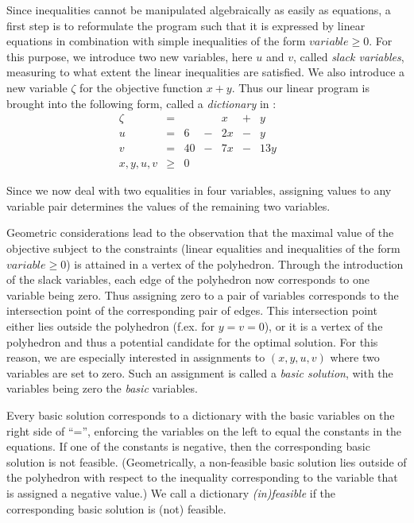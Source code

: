 \documentclass[ukenglish]{nik}
\begin{document}
Since inequalities cannot be manipulated algebraically as easily
as equations, a first step is to reformulate the program such that it is expressed
by linear equations in combination with simple inequalities of the form
$\mathit{variable}\geq 0$. For this purpose, we introduce
two new variables, here $u$ and $v$, called \emph{slack variables}, 
measuring to what extent the linear inequalities are satisfied. 
We also introduce a new variable $\zeta$
for the objective function $x+y$. 
Thus our linear program is brought into the following form, 
called a \emph{dictionary} in \cite{Vanderbei}:
\[    
    \begin{array}{lcrcrcrcr}
      \zeta&=&   & &     x &+&     y & &  \\\hline
      u    &=& 6 &-&   2 x &-&     y & &  \\
      v    &=& 40&-&   7 x &-&  13 y & &  \\
      x,y,u,v  &\geq&0     & &  & &  & &    
    \end{array}
\]

Since we now deal with two equalities in four variables, 
assigning values to any variable pair determines the values of the remaining two variables.

Geometric considerations lead to the observation that the
maximal value of the objective subject to the constraints (linear
equalities and inequalities of the form 
$\mathit{variable}\geq 0$) is attained in a vertex of the polyhedron. 
Through the introduction of the slack variables, each edge of the polyhedron now corresponds to one variable
being zero. Thus assigning zero to a pair of variables corresponds to the intersection point of the corresponding pair of edges. 
This intersection point either lies outside the polyhedron (f.ex. for $y=v=0$), or  
it is a vertex of the polyhedron and thus a potential candidate for the optimal solution. 
For this reason, we are especially interested in assignments to $(x,y,u,v)$ where two variables are set to zero. 
Such an assignment is called a \emph{basic solution}, with the variables being zero the \emph{basic} variables.

Every basic solution corresponds to a dictionary with the basic variables on the right side of ``='', 
enforcing the variables on the left to equal the constants in the equations. 
If one of the constants is negative, then the corresponding basic solution is not feasible. 
(Geometrically, a non-feasible basic solution lies outside of the polyhedron with respect to 
the inequality corresponding to the variable that is assigned a negative value.)
We  call a dictionary \emph{(in)feasible} if the corresponding basic solution is (not) feasible.
\end{document}
